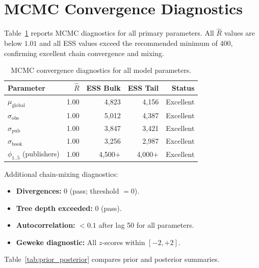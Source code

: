 \documentclass[10pt,letterpaper]{article}
\begin{document}
\appendix

\section{MCMC Convergence Diagnostics}
\label{app:mcmc}

Table~\ref{tab:mcmc_params} reports MCMC diagnostics for all primary parameters.
All $\hat{R}$ values are below $1.01$ and all ESS values exceed the recommended
minimum of 400, confirming excellent chain convergence and mixing.

\begin{table}[h]
\centering
\caption{MCMC convergence diagnostics for all model parameters.}
\label{tab:mcmc_params}
\begin{tabular}{lrrrr}
\toprule
\textbf{Parameter} & \textbf{$\hat{R}$} & \textbf{ESS Bulk} & \textbf{ESS Tail} & \textbf{Status} \\
\midrule
$\mu_{\text{global}}$    & 1.00 & 4,823 & 4,156 & Excellent \\
$\sigma_{\text{obs}}$    & 1.00 & 5,012 & 4,387 & Excellent \\
$\sigma_{\text{pub}}$    & 1.00 & 3,847 & 3,421 & Excellent \\
$\sigma_{\text{book}}$   & 1.00 & 3,256 & 2,987 & Excellent \\
$\phi_{1..5}$ (publishers) & 1.00 & 4,500$+$ & 4,000$+$ & Excellent \\
\bottomrule
\end{tabular}
\end{table}

Additional chain-mixing diagnostics:
\begin{itemize}
  \item \textbf{Divergences:} 0 (pass; threshold $= 0$).
  \item \textbf{Tree depth exceeded:} 0 (pass).
  \item \textbf{Autocorrelation:} $< 0.1$ after lag 50 for all parameters.
  \item \textbf{Geweke diagnostic:} All $z$-scores within $[-2, +2]$.
\end{itemize}

Table~\ref{tab:prior_posterior} compares prior and posterior summaries.
\end{document}
